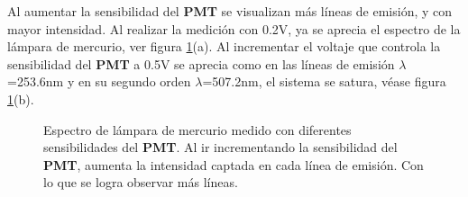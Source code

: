 Al aumentar la sensibilidad del \textbf{PMT} se visualizan más líneas de emisión, y con mayor intensidad. Al realizar la medición con 0.2V, ya se aprecia el espectro de la lámpara de mercurio, ver figura \ref{fig:hglamp}(a). Al incrementar el voltaje que controla la sensibilidad del \textbf{PMT} a 0.5V se aprecia como en las líneas de emisión $\lambda$=253.6nm y en su segundo orden $\lambda$=507.2nm, el sistema se satura, véase figura \ref{fig:hglamp}(b).
\begin{figure}[h!]
	\caption[Espectro de lámpara de mercurio medido con diferentes sensibilidades del \textbf{PMT}]{Espectro de lámpara de mercurio medido con diferentes sensibilidades del \textbf{PMT}. Al ir incrementando la sensibilidad del \textbf{PMT}, aumenta la intensidad captada en cada línea de emisión. Con lo que se logra observar más líneas.}
	\label{fig:hglamp}
\end{figure}
\newpage


